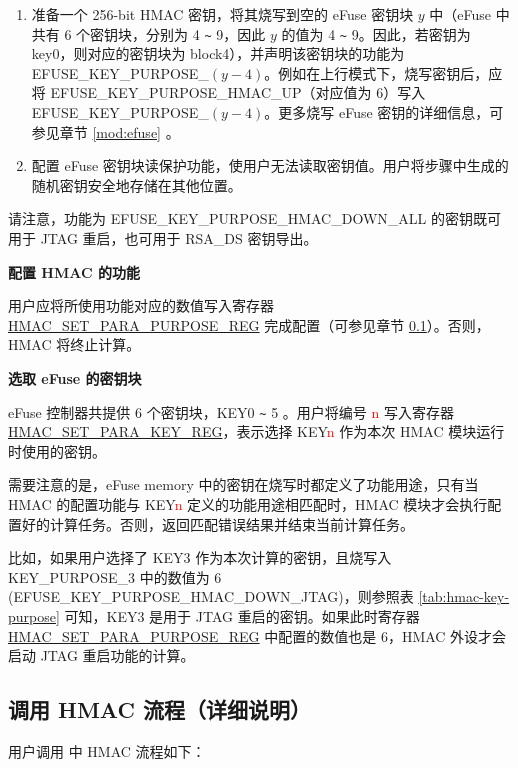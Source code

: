 \documentclass[main\_\_CN.tex]{subfiles}
\begin{document}
\begin{enumerate}
    \item 准备一个 256-bit HMAC 密钥，将其烧写到空的 eFuse 密钥块 $y$ 中（eFuse 中共有 6 个密钥块，分别为 4 \verb+~+ 9，因此 $y$ 的值为 4 \verb+~+ 9。因此，若密钥为 key0，则对应的密钥块为 block4），并声明该密钥块的功能为\\ EFUSE\_KEY\_PURPOSE\_$(y-4)$。例如在上行模式下，烧写密钥后，应将 EFUSE\_KEY\_PURPOSE\_HMAC\_UP（对应值为 6）写入 EFUSE\_KEY\_PURPOSE\_$(y-4)$。更多烧写 eFuse 密钥的详细信息，可参见章节 \ref{mod:efuse} \textit{}。
    \item 配置 eFuse 密钥块读保护功能，使用户无法读取密钥值。用户将步骤中生成的随机密钥安全地存储在其他位置。
\end{enumerate}

请注意，功能为 EFUSE\_KEY\_PURPOSE\_HMAC\_DOWN\_ALL 的密钥既可用于 JTAG 重启，也可用于 RSA\_DS 密钥导出。




\textbf{配置 HMAC 的功能}

用户应将所使用功能对应的数值写入寄存器 \hyperref[regdesc:HMACSETPARAPURPOSEREG]{HMAC\_SET\_PARA\_PURPOSE\_REG} 完成配置（可参见章节 \ref{sec:hmac-process-detailed}）。否则，HMAC 将终止计算。

\textbf{选取 eFuse 的密钥块}
\label{sec:hmac-config-efuse-key}

eFuse 控制器共提供 6 个密钥块，KEY0 \verb+~+ 5 。用户将编号 \textcolor{red}{n} 写入寄存器 \hyperref[regdesc:HMACSETPARAKEYREG]{HMAC\_SET\_PARA\_KEY\_REG}，表示选择 KEY\textcolor{red}{n} 作为本次 HMAC 模块运行时使用的密钥。

需要注意的是，eFuse memory 中的密钥在烧写时都定义了功能用途，只有当 HMAC 的配置功能与 KEY\textcolor{red}{n} 定义的功能用途相匹配时，HMAC 模块才会执行配置好的计算任务。否则，返回匹配错误结果并结束当前计算任务。

比如，如果用户选择了 KEY3 作为本次计算的密钥，且烧写入 KEY\_PURPOSE\_3 中的数值为 6\\ (EFUSE\_KEY\_PURPOSE\_HMAC\_DOWN\_JTAG)，则参照表 \ref{tab:hmac-key-purpose} 可知，KEY3 是用于 JTAG 重启的密钥。如果此时寄存器 \hyperref[regdesc:HMACSETPARAPURPOSEREG]{HMAC\_SET\_PARA\_PURPOSE\_REG} 中配置的数值也是 6，HMAC 外设才会启动 JTAG 重启功能的计算。


\subsection{调用 HMAC 流程（详细说明）}
\label{sec:hmac-process-detailed}
用户调用 \chipname{} 中 HMAC 流程如下：
\end{document}
